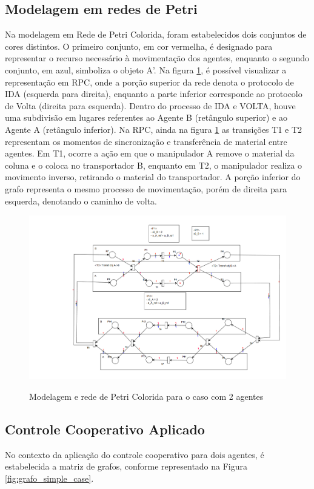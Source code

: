 \subsection{Modelagem em redes de Petri}
Na modelagem em Rede de Petri Colorida, foram estabelecidos dois conjuntos de cores distintos. O primeiro conjunto, em cor vermelha, é designado para representar o recurso necessário à movimentação dos agentes, enquanto o segundo conjunto, em azul, simboliza o objeto A'. Na figura \ref{fig:simple_case_rpc}, é possível visualizar a representação em RPC, onde a porção superior da rede denota o protocolo de IDA (esquerda para direita), enquanto a parte inferior corresponde ao protocolo de Volta (direita para esquerda). Dentro do processo de IDA e VOLTA, houve uma subdivisão em lugares referentes ao Agente B (retângulo superior) e ao Agente A (retângulo inferior).
Na RPC, ainda na figura \ref{fig:simple_case_rpc} as transições T1 e T2 representam os momentos de sincronização e transferência de material entre agentes. Em T1, ocorre a ação em que o manipulador A remove o material da coluna e o coloca no transportador B, enquanto em T2, o manipulador realiza o movimento inverso, retirando o material do transportador. A porção inferior do grafo representa o mesmo processo de movimentação, porém de direita para esquerda, denotando o caminho de volta.    
\begin{figure}[ht]
\centering
\caption{Modelagem e rede de Petri Colorida para o caso com 2 agentes}
\includegraphics[width=1\linewidth]{figures/Simulation/Simples/simple_case_rpc.png}
\label{fig:simple_case_rpc}
\end{figure}

\subsection{Controle Cooperativo Aplicado}
No contexto da aplicação do controle cooperativo para dois agentes, é estabelecida a matriz de grafos, conforme representado na Figura \ref{fig:grafo_simple_case}. 

